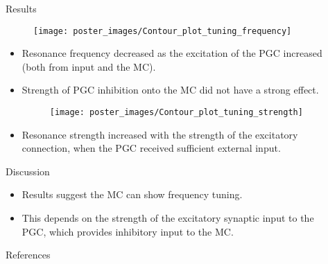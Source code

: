 \documentclass[final,hyperref={pdfpagelabels=false}]{beamer}
\begin{document}
\begin{frame}{}
\begin{columns}[t]
\begin{column}{.48\linewidth}
\end{column}
\begin{column}{.48\linewidth}

\begin{block}{Results}
\begin{figure}
\center
\texttt{[image: poster\_images/Contour\_plot\_tuning\_frequency]}
\end{figure}

\begin{itemize}
\item Resonance frequency decreased as the excitation of the PGC increased (both from input and the MC).
\item Strength of PGC inhibition onto the MC did not have a strong effect.

\begin{figure}
\center
\texttt{[image: poster\_images/Contour\_plot\_tuning\_strength]}
\end{figure} 

\item Resonance strength increased with the strength of the excitatory connection, when the PGC received sufficient external input.
\end{itemize}
\end{block}

\begin{block}{Discussion}
\begin{itemize}
\item Results suggest the MC can show frequency tuning.
\item This depends on the strength of the excitatory synaptic input to the PGC, which provides inhibitory input to the MC. \cite{celani2014odor}
\end{itemize}
\end{block}

\begin{block}{References}
\nocite{*}

{\footnotesize
}
\end{block}

\end{column}
\end{columns}
\end{frame}
\end{document}
